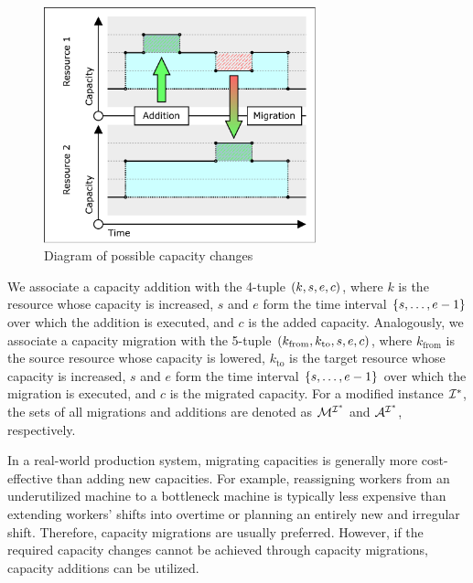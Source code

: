 \begin{figure}
    \centering
    \includegraphics[width=0.7\textwidth]{img/Capacities-Changes.pdf}
    \caption{Diagram of possible capacity changes}
    \label{fig:CapacityChanges}
\end{figure}

We associate a capacity addition with the 4-tuple $(k, s, e, c)$, where
$k$ is the resource whose capacity is increased,
$s$ and $e$ form the time interval $\{{s}, \dots, {e-1}\}$ over which the addition is executed, and
$c$ is the added capacity.
Analogously, we associate a capacity migration
with the 5-tuple $(k_{\text{from}}, k_{\text{to}}, s, e, c)$, where
$k_{\text{from}}$ is the source resource whose capacity is lowered,
$k_{\text{to}}$ is the target resource whose capacity is increased,
$s$ and $e$ form the time interval $\{{s}, \dots, {e-1}\}$ over which the migration is executed, and
$c$ is the migrated capacity.
For a modified instance $\mathcal{I}^*$, the sets of all migrations and additions are denoted as
$\mathcal{M}^{\mathcal{I}^*}$ and $\mathcal{A}^{\mathcal{I}^*}$, respectively.

In a real-world production system,
migrating capacities is generally more cost-effective than adding new capacities.
For example, reassigning workers from an underutilized machine to a bottleneck machine
is typically less expensive than extending workers' shifts into overtime
or planning an entirely new and irregular shift.
Therefore, capacity migrations are usually preferred.
However, if the required capacity changes cannot be achieved through capacity migrations,
capacity additions can be utilized.

